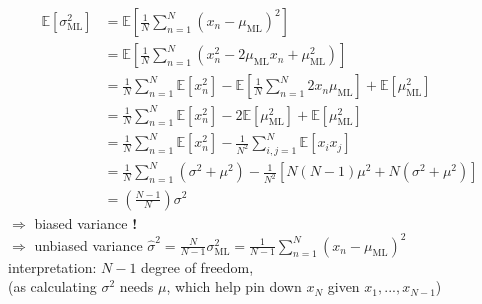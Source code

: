 \begin{itemize}
\begin{itemize}
\begin{itemize}
		\Item \begin{align*} \mathbb E[\sigma_\text{ML}^2] &= \mathbb E[\frac 1N \sum_{n=1}^N(x_n-\mu_{\text{ML}})^2] \\
		&= \mathbb E [ \frac 1N \sum_{n=1}^{N}(x_n^2-2\mu_\text{ML}x_n+\mu_\text{ML}^2) ] \\ 
		&= \frac 1N \sum_{n=1}^N \mathbb E[x_n^2] - \mathbb E[\frac 1N \sum_{n=1}^N 2x_n \mu_\text{ML}] + \mathbb E[\mu_\text{ML}^2] \\ 
		&= \frac 1N \sum_{n=1}^N \mathbb E[x_n^2] - 2\mathbb E[\mu_\text{ML}^2] + \mathbb E[\mu_\text{ML}^2] \\
		&= \frac 1N \sum_{n=1}^N \mathbb E[x_n^2] - \frac 1{N^2} \sum_{i,j=1}^N \mathbb E[x_ix_j] \\
		&= \frac 1N \sum_{n=1}^N (\sigma^2 + \mu^2) - \frac 1{N^2} [N(N-1)\mu^2 + N(\sigma^2+\mu^2)] \tag{by 2nd moment of Gaussian \(\mathbb E[x^2]\) and i.i.d assumption} \\
		&= \left(\frac {N-1}N  \right) \sigma^2 \end{align*}
		$\Rightarrow$ biased variance \textbf{!} \\
		$\Rightarrow $ unbiased variance $\displaystyle \hat \sigma^2 = \frac N {N-1}\sigma^2_\text{ML} = \frac 1{N-1} \sum_{n=1}^N (x_n-\mu_\text{ML})^2 $ \\
		interpretation: $N-1$  degree of freedom, \\
		(as calculating $\sigma^2$ needs $\mu$, which help pin down $x_N$ given $x_1,...,x_{N-1}$) \\
		\end{itemize}
	\end{itemize}
\end{itemize}

